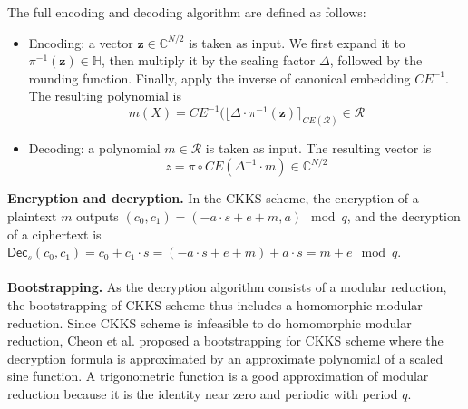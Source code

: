     The full encoding and decoding algorithm are defined as follows: 
    \begin{itemize}
    \item Encoding: a vector $\mathbf{z} \in \mathbb{C}^{N/2}$ is taken as input. We first expand it to $\pi^{-1}(\mathbf{z}) \in \mathbb{H}$, then multiply it by the scaling factor $\Delta$, followed by the rounding function. Finally, apply the inverse of canonical embedding $CE^{-1}$. The resulting polynomial is$$m(X) = CE^{-1}(\lfloor\Delta\cdot\pi^{-1}(\mathbf{z})\rceil_{CE(\mathcal{R})} \in \mathcal{R}$$
    \item Decoding: a polynomial $m \in \mathcal{R}$ is taken as input. The resulting vector is $$z = \pi \circ CE(\Delta^{-1}\cdot m) \in \mathbb{C}^{N/2}$$
    \end{itemize}
    \textbf{Encryption and decryption.} In the CKKS scheme, the encryption of a plaintext $m$ outputs $(c_0, c_1) = (-a \cdot s + e + m, a) \mod q$, and the decryption of a ciphertext is $\textsf{Dec}_s(c_0, c_1) = c_0 + c_1 \cdot s = (-a \cdot s + e + m) + a \cdot s = m + e \mod q$.\\
    \\
    \textbf{Bootstrapping.} As the decryption algorithm consists of a modular reduction, the bootstrapping of CKKS scheme thus includes a homomorphic modular reduction. Since CKKS scheme is infeasible to do homomorphic modular reduction, Cheon et al. \cite{10.1007/978-3-319-78381-9_14} proposed a bootstrapping for CKKS scheme where the  decryption formula is approximated by an approximate polynomial of a scaled sine function. A trigonometric function is a good approximation of modular reduction because it is the identity near zero and periodic with period $q$. \\
    \\

